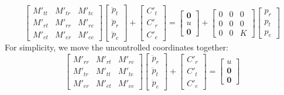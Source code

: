 \documentclass[a4paper,12pt,oneside]{report}
\begin{document}
\begin{equation}
  \begin{bmatrix}
    M'_{tt}&M'_{tr}&M'_{te}\\
    M'_{rt}&M'_{rr}&M'_{re}\\
    M'_{et}&M'_{er}&M'_{ee}
  \end{bmatrix}
  \begin{bmatrix}
    \ddot{p}_t\\
    \ddot{p}_r\\
    \ddot{p}_e
  \end{bmatrix}+\begin{bmatrix}
    C'_t\\
    C'_r\\
    C'_e
  \end{bmatrix}=\begin{bmatrix}
    \textbf{0}\\
    u\\
    \textbf{0}
    \end{bmatrix}
    +\begin{bmatrix}
      0&0&0\\
      0&0&0\\
      0&0&K
    \end{bmatrix}\begin{bmatrix}
      p_r\\
      p_t\\
      p_e
    \end{bmatrix}
\end{equation}
For simplicity, we move the uncontrolled coordinates together:
\begin{equation}
  \begin{bmatrix}
    M'_{rr}&M'_{rt}&M'_{re}\\
    M'_{tr}&M'_{tt}&M'_{te}\\
    M'_{er}&M'_{et}&M'_{ee}
  \end{bmatrix}
  \begin{bmatrix}
    \ddot{p}_r\\
    \ddot{p}_t\\
    \ddot{p}_e
  \end{bmatrix}+\begin{bmatrix}
    C'_r\\
    C'_t\\
    C'_e
  \end{bmatrix}=\begin{bmatrix}
    u\\
    \textbf{0}\\
    \textbf{0}
    \end{bmatrix}
\end{equation}
\end{document}
